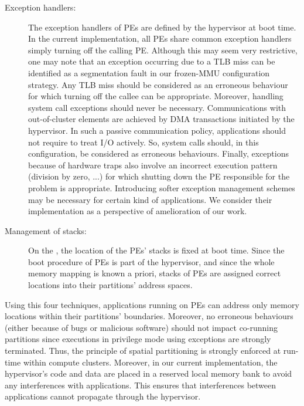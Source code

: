 \documentclass[main.tex]{subfiles}
\begin{document}
\begin{description}
    \item[Exception handlers: ] The exception handlers of PEs are defined by the hypervisor at boot time. In the current implementation, all PEs share common exception handlers simply turning off the calling PE. Although this may seem very restrictive, one may note that an exception occurring due to a TLB miss can be identified as a segmentation fault in our frozen-MMU configuration strategy. Any TLB miss should be considered as an erroneous behaviour for which turning off the callee can be appropriate. Moreover, handling system call exceptions should never be necessary. Communications with out-of-cluster elements are achieved by DMA transactions initiated by the hypervisor. In such a passive communication policy, applications should not require to treat I/O actively. So, system calls should, in this configuration, be considered as erroneous behaviours. Finally, exceptions because of hardware traps also involve an incorrect execution pattern (division by zero, ...) for which shutting down the PE responsible for the problem is appropriate. Introducing softer exception management schemes may be necessary for certain kind of applications. We consider their implementation as a perspective of amelioration of our work.
    \item[Management of stacks: ] On the \mppalong, the location of the PEs' stacks is fixed at boot time. Since the boot procedure of PEs is part of the hypervisor, and since the whole memory mapping is known a priori, stacks of PEs are assigned correct locations into their partitions' address spaces.
\end{description}

Using this four techniques, applications running on PEs can address only memory locations within their partitions' boundaries. Moreover, no erroneous behaviours (either because of bugs or malicious software) should not impact co-running partitions since executions in privilege mode using exceptions are strongly terminated. Thus, the principle of spatial partitioning is strongly enforced at run-time within compute clusters. Moreover, in our current implementation, the hypervisor's code and data are placed in a reserved local memory bank to avoid any interferences with applications. This ensures that interferences between applications cannot propagate through the hypervisor. 
\end{document}
